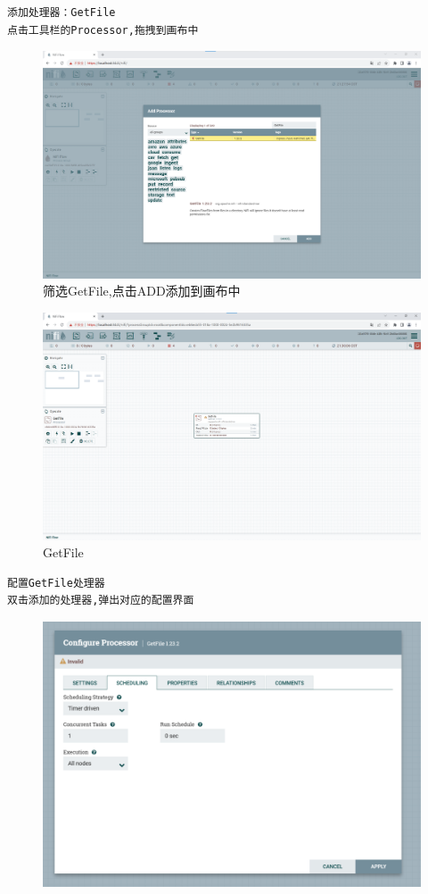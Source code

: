 \documentclass{article}
\begin{document}
\begin{enumerate}
\begin{lstlisting}
添加处理器：GetFile
点击工具栏的Processor,拖拽到画布中
    \end{lstlisting}
    \begin{figure}[htp]
        \centering
        \includegraphics[width=13cm]{getFile.png}
        \caption{筛选GetFile,点击ADD添加到画布中}
        \label{}
    \end{figure}
    \begin{figure}[htp]
        \centering
        \includegraphics[width=13cm]{createGetFile.png}
        \caption{GetFile}
        \label{pic6}
    \end{figure}
    \begin{lstlisting}
配置GetFile处理器
双击添加的处理器,弹出对应的配置界面
    \end{lstlisting}
    \begin{figure}[htp]
        \centering
        \includegraphics[width=13cm]{getfile配置界面.png}

\end{figure}
\end{enumerate}
\end{document}
